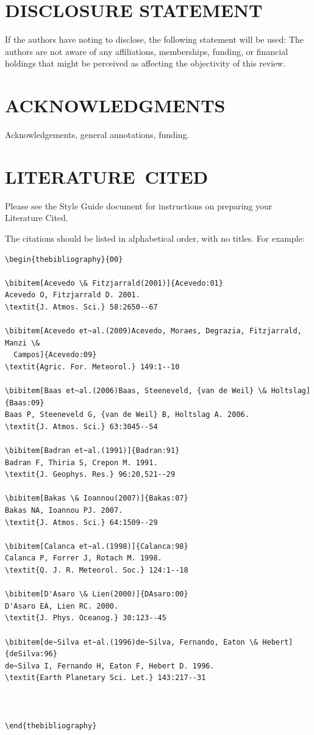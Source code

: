 \documentclass[a4paper]{ar-1col}
\begin{document}
\section*{DISCLOSURE STATEMENT}
If the authors have noting to disclose, the following statement will be used: The authors are not aware of any affiliations, memberships, funding, or financial holdings that
might be perceived as affecting the objectivity of this review. 

\section*{ACKNOWLEDGMENTS}
Acknowledgements, general annotations, funding.

%
\section*{LITERATURE\ CITED}


\noindent
Please see the Style Guide document for instructions on preparing your Literature Cited.

The citations should be listed in alphabetical order, with no titles. For example:






\begin{verbatim}
\begin{thebibliography}{00}

\bibitem[Acevedo \& Fitzjarrald(2001)]{Acevedo:01}
Acevedo O, Fitzjarrald D. 2001.
\textit{J. Atmos. Sci.} 58:2650--67

\bibitem[Acevedo et~al.(2009)Acevedo, Moraes, Degrazia, Fitzjarrald, Manzi \&
  Campos]{Acevedo:09}
\textit{Agric. For. Meteorol.} 149:1--10

\bibitem[Baas et~al.(2006)Baas, Steeneveld, {van de Weil} \& Holtslag]{Baas:09}
Baas P, Steeneveld G, {van de Weil} B, Holtslag A. 2006.
\textit{J. Atmos. Sci.} 63:3045--54

\bibitem[Badran et~al.(1991)]{Badran:91}
Badran F, Thiria S, Crepon M. 1991.
\textit{J. Geophys. Res.} 96:20,521--29

\bibitem[Bakas \& Ioannou(2007)]{Bakas:07}
Bakas NA, Ioannou PJ. 2007.
\textit{J. Atmos. Sci.} 64:1509--29

\bibitem[Calanca et~al.(1998)]{Calanca:98}
Calanca P, Forrer J, Rotach M. 1998.
\textit{Q. J. R. Meteorol. Soc.} 124:1--18

\bibitem[D'Asaro \& Lien(2000)]{DAsaro:00}
D'Asaro EA, Lien RC. 2000.
\textit{J. Phys. Oceanog.} 30:123--45

\bibitem[de~Silva et~al.(1996)de~Silva, Fernando, Eaton \& Hebert]{deSilva:96}
de~Silva I, Fernando H, Eaton F, Hebert D. 1996.
\textit{Earth Planetary Sci. Let.} 143:217--31



\end{thebibliography}
\end{verbatim}
\end{document}
